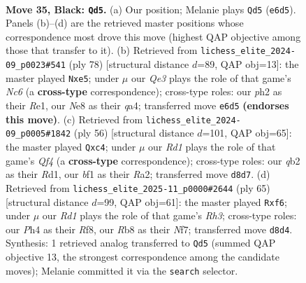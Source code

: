 \documentclass[11pt]{article}
\begin{document}
\clearpage

\begin{figure}[p]\centering
\begin{subfigure}{0.46\textwidth}\centering
\resizebox{\linewidth}{!}{%
\newchessgame
\chessboard[
  setfen={1r1rnk2/p1p5/4qp2/2P5/3P1P1p/1P6/1Q1B1KRP/5BR1 b - - 2 35},
  showmover=false,
  pgfstyle=straightmove, color=movearrow, markmove={e6-d5}
]}
\caption{}
\end{subfigure}\hfill
\begin{subfigure}{0.46\textwidth}\centering
\resizebox{\linewidth}{!}{%
\newchessgame
\chessboard[
  setfen={5rk1/p4rb1/2N5/1PQPp2p/q5p1/5pP1/7P/4RR1K w - - 0 40},
  showmover=false,
  pgfstyle=straightmove, color=movearrow, markmove={c6-e5}
]}
\caption{}
\end{subfigure}
\\[4pt]
\begin{subfigure}{0.46\textwidth}\centering
\resizebox{\linewidth}{!}{%
\newchessgame
\chessboard[
  setfen={1r2rbk1/1q3pp1/3p3p/2pP4/2p2Q2/2P2N1P/R4PP1/3R2K1 w - - 3 29},
  showmover=false,
  pgfstyle=straightmove, color=movearrow, markmove={f4-c4}
]}
\caption{}
\end{subfigure}\hfill
\begin{subfigure}{0.46\textwidth}\centering
\resizebox{\linewidth}{!}{%
\newchessgame
\chessboard[
  setfen={5r1k/3q1n1p/5P1r/1p3Pp1/3P4/2P1Q1B1/7P/R4R1K b - - 0 33},
  showmover=false,
  pgfstyle=straightmove, color=movearrow, markmove={h6-f6}
]}
\caption{}
\end{subfigure}
\caption{\textbf{Move 35, Black: \texttt{Qd5}.} (a) Our position; Melanie plays \texttt{Qd5} (\texttt{e6d5}). Panels (b)--(d) are the retrieved master positions whose correspondence most drove this move (highest QAP objective among those that transfer to it). (b) Retrieved from \texttt{lichess\_elite\_2024-09\_p0023\#541} (ply 78) [structural distance $d$=89, QAP obj=13]: the master played \texttt{Nxe5}; under $\mu$ our \emph{Qe3} plays the role of that game's \emph{Nc6} (a \textbf{cross-type} correspondence); cross-type roles: our \emph{p}h2 as their \emph{R}e1, our \emph{N}e8 as their \emph{q}a4; transferred move \texttt{e6d5} \textbf{(endorses this move)}. (c) Retrieved from \texttt{lichess\_elite\_2024-09\_p0005\#1842} (ply 56) [structural distance $d$=101, QAP obj=65]: the master played \texttt{Qxc4}; under $\mu$ our \emph{Rd1} plays the role of that game's \emph{Qf4} (a \textbf{cross-type} correspondence); cross-type roles: our \emph{q}b2 as their \emph{R}d1, our \emph{b}f1 as their \emph{R}a2; transferred move \texttt{d8d7}. (d) Retrieved from \texttt{lichess\_elite\_2025-11\_p0000\#2644} (ply 65) [structural distance $d$=99, QAP obj=61]: the master played \texttt{Rxf6}; under $\mu$ our \emph{Rd1} plays the role of that game's \emph{Rh3}; cross-type roles: our \emph{P}h4 as their \emph{R}f8, our \emph{R}b8 as their \emph{N}f7; transferred move \texttt{d8d4}. Synthesis: 1 retrieved analog transferred to \texttt{Qd5} (summed QAP objective 13, the strongest correspondence among the candidate moves); Melanie committed it via the \texttt{search} selector.}
\label{fig:thought-m69}
\end{figure}
\end{document}
